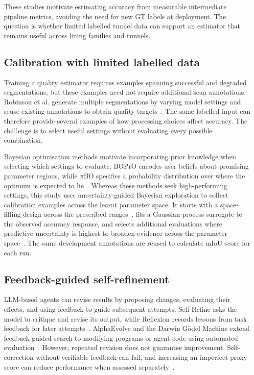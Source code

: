 \documentclass[a4paper,fleqn]{cas-dc}
\begin{document}
These studies motivate estimating accuracy from measurable intermediate pipeline metrics, avoiding the need for new GT labels at deployment. The question is whether limited labelled tunnel data can support an estimator that remains useful across lining families and tunnels.

\subsection{Calibration with limited labelled data}

Training a quality estimator requires examples spanning successful and degraded segmentations, but these examples need not require additional scan annotations. Robinson et al. generate multiple segmentations by varying model settings and reuse existing annotations to obtain quality targets~\cite{robinson2018segmentationQuality}. The same labelled input can therefore provide several examples of how processing choices affect accuracy. The challenge is to select useful settings without evaluating every possible combination.

Bayesian optimisation methods motivate incorporating prior knowledge when selecting which settings to evaluate. BOPrO encodes user beliefs about promising parameter regions, while $\pi$BO specifies a probability distribution over where the optimum is expected to lie~\cite{souza2020prior,hvarfner2022pibo}. Whereas these methods seek high-performing settings, this study uses uncertainty-guided Bayesian exploration to collect calibration examples across the learnt parameter space. It starts with a space-filling design across the prescribed ranges~\cite{joe2008constructing}, fits a Gaussian-process surrogate to the observed accuracy response, and selects additional evaluations where predictive uncertainty is highest to broaden evidence across the parameter space~\cite{gramacy2009adaptive,gramacy2020surrogates}. The same development annotations are reused to calculate mIoU score for each run.

\subsection{Feedback-guided self-refinement}

LLM-based agents can revise results by proposing changes, evaluating their effects, and using feedback to guide subsequent attempts. Self-Refine asks the model to critique and revise its output, while Reflexion records lessons from task feedback for later attempts~\cite{madaan2023selfrefine,shinn2023reflexion}. AlphaEvolve and the Darwin G\"odel Machine extend feedback-guided search to modifying programs or agent code using automated evaluation~\cite{novikov2025alphaevolve,zhang2025darwin}. However, repeated revision does not guarantee improvement. Self-correction without verifiable feedback can fail, and increasing an imperfect proxy score can reduce performance when assessed separately~\cite{huang2024selfcorrect,gao2023overoptimization}.
\end{document}
